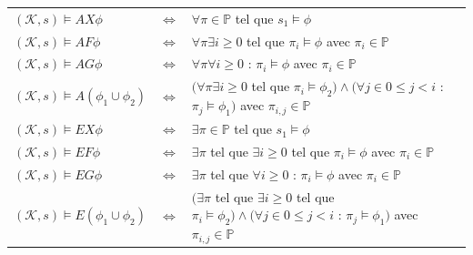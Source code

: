 \documentclass[runningheads,a4paper,10pt]{llncs}
\begin{document}
 
\begin{center}
\begin{tabular}{lll}
   $(\mathcal{K},s) \vDash AX\phi$ & \hspace{0.5cm} $\Leftrightarrow$ \hspace{0.5cm} & $\forall \pi \in \mathbb{P}$ tel que $s_{1} \vDash \phi$  \\
   $(\mathcal{K},s) \vDash AF\phi$ & \hspace{0.5cm} $\Leftrightarrow$ \hspace{0.5cm} & $\forall \pi \exists i\ge 0$ tel que $\pi_{i} \vDash \phi$ avec $\pi_{i} \in \mathbb{P}$  \\
   $(\mathcal{K},s) \vDash AG\phi$ & \hspace{0.5cm} $\Leftrightarrow$ \hspace{0.5cm} & $\forall \pi \forall i\ge 0$ : $\pi_{i} \vDash \phi$  avec $\pi_{i} \in \mathbb{P}$ \\
   $(\mathcal{K},s) \vDash A(\phi_{1} \cup \phi_{2})$ & \hspace{0.5cm} $\Leftrightarrow$ \hspace{0.5cm} & $(\forall \pi \exists i\ge 0$ tel que $\pi_{i} \vDash \phi_{2}) \wedge (\forall j \in 0 \le j < i$ : $\pi_{j} \vDash \phi_{1})$ avec $\pi_{i,j} \in \mathbb{P}$\\
   $(\mathcal{K},s) \vDash EX\phi$ & \hspace{0.5cm} $\Leftrightarrow$ \hspace{0.5cm} & $\exists \pi \in \mathbb{P}$ tel que $s_{1} \vDash \phi$  \\
   $(\mathcal{K},s) \vDash EF\phi$ & \hspace{0.5cm} $\Leftrightarrow$ \hspace{0.5cm} & $\exists \pi$ tel que $\exists i \ge 0$ tel que $\pi_{i} \vDash \phi$ avec $\pi_{i} \in \mathbb{P}$ \\
   $(\mathcal{K},s) \vDash EG\phi$ & \hspace{0.5cm} $\Leftrightarrow$ \hspace{0.5cm} & $\exists \pi$ tel que $\forall i\ge 0$ : $\pi_{i} \vDash \phi$  avec $\pi_{i} \in \mathbb{P}$\\
   $(\mathcal{K},s) \vDash E(\phi_{1} \cup \phi_{2})$ & \hspace{0.5cm} $\Leftrightarrow$ \hspace{0.5cm} & $(\exists \pi$ tel que $\exists i \ge 0$ tel que $\pi_{i} \vDash \phi_{2}) \wedge (\forall j \in 0 \le j < i$ : $\pi_{j} \vDash \phi_{1})$ avec $\pi_{i,j} \in \mathbb{P}$\\
\end{tabular}
\end{center}
\end{document}
